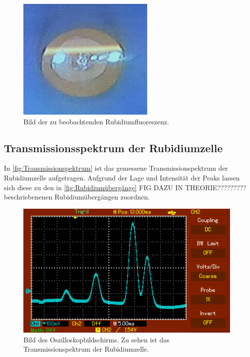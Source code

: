 \begin{figure}
    \centering
    \includegraphics{content/pics/Fluoreszenz.png}
    \caption{Bild der zu beobachtenden Rubidiumfluoreszenz.}
    \label{fig:Rubidiumfluoreszenz}
\end{figure}

\subsection{Transmissionsspektrum der Rubidiumzelle}
In \autoref{fig:Transmissionspektrum} ist das gemessene Transmissionspektrum der Rubidiumzelle aufgetragen. Aufgrund der Lage und Intensität der Peaks
lassen sich diese zu den in \autoref{fig:Rubidiumübergänge} FIG DAZU IN THEORIE????????? beschriebenenen Rubidiumübergängen zuordnen.

\begin{figure}
    \centering
    \includegraphics{content/pics/Peaks.pdf}
    \caption{Bild des Oszilloskopbildschirms. Zu sehen ist das Transmissionspektrum der Rubidiumzelle.}
    \label{fig:Rubidiumübergänge}
\end{figure}